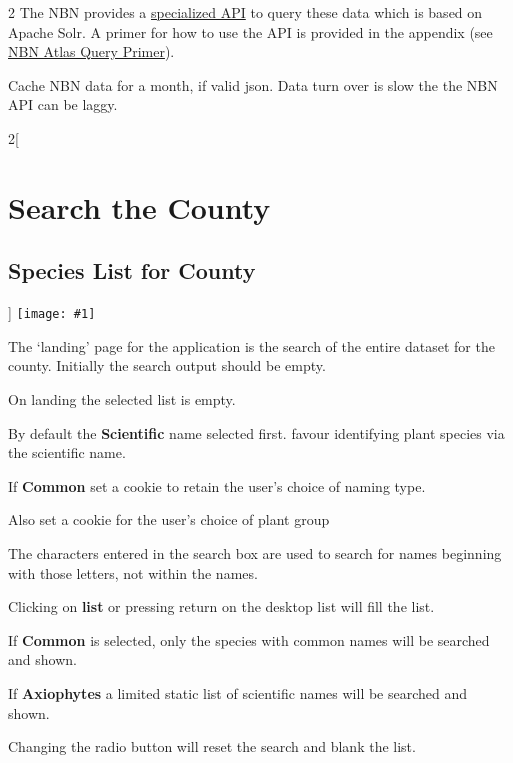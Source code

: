 \documentclass[a4paper,12pt,landscape]{article}
\newcommand{\wireframe}[1]{\texttt{[image: \#1]}\clearpage}
\begin{document}
\begin{multicols*}{2}
  The NBN provides a \href{https://api.nbnatlas.org/}{specialized API}
  to query these data which is based on Apache Solr.
  A primer for how to use the API is provided in the appendix
  (see \hyperref[sec:primer]{NBN Atlas Query Primer}).

  \begin{description}
    \item Cache NBN data for a month, if valid json.
      Data turn over is slow the the NBN API can be laggy. 
    \item[] 
  \end{description} 

\end{multicols*}

\begin{multicols*}{2}[%
  \section{Search the County}%
  \subsection{Species List for County}%
]
\thispagestyle{empty}
\wireframe{./wireframes/Species__ListForCounty.png}%

The `landing' page for the application is the search of the entire dataset for the county.
Initially the search output should be empty.

\begin{todolist}
  \item On landing the selected list is empty.
  \item By default the \textbf{Scientific} name selected first.  
  favour identifying
  plant species via the scientific name.
  \item If \textbf{Common} set a cookie to retain the user's choice of naming type.
  \item Also set a cookie for the user's choice of plant group
\end{todolist}

\begin{todolist}

  \item The characters entered in the search box are used to search for names beginning with those letters,
    not within the names.
  \item Clicking on \textbf{list} or pressing return on the desktop list will fill the list.
  \item If \textbf{Common} is selected, only the species with common names will be searched and shown.
  \item If \textbf{Axiophytes} a limited static list of scientific names will be searched and shown.
  \item Changing the radio button will reset the search and blank the list.
\end{todolist}


\end{multicols*}
\end{document}
